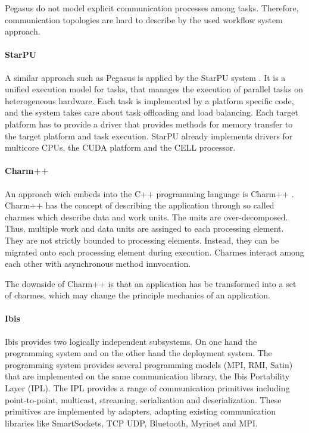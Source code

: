 Pegasus do not model explicit communication processes among tasks.
Therefore, communication topologies are hard to describe by the used
workflow system approach.


\paragraph*{StarPU} 
A similar approach such as Pegasus is applied by the StarPU system
\cite{ref:starpu}.  It is a unified execution model for tasks, that
manages the execution of parallel tasks on heterogeneous hardware.
Each task is implemented by a platform specific code, and the system
takes care about task offloading and load balancing. Each target
platform has to provide a driver that provides methods for memory
transfer to the target platform and task execution. StarPU already
implements drivers for multicore CPUs, the CUDA platform and the CELL
processor.

\paragraph*{Charm++} 
An approach wich embeds into the C++ programming language is
Charm++ \cite{ref:charm}. Charm++ has the concept of describing the
application through so called charmes which describe data and work
units. The units are over-decomposed. Thus, multiple work and data
units are assinged to each processing element. They are not strictly
bounded to processing elements. Instead, they can be migrated onto
each processing element during execution. Charmes interact among each
other with asynchronous method innvocation.

The downside of Charm++ is that an application has be transformed into
a set of charmes, which may change the principle mechanics of an
application.

\paragraph*{Ibis} 
Ibis \cite{ref:ibis} provides two logically independent subsystems.
On one hand the programming system and on the other hand the
deployment system. The programming system provides several programming
models (MPI, RMI, Satin) that are implemented on the same
communication library, the Ibis Portability Layer (IPL).  The IPL
provides a range of communication primitives including point-to-point,
multicast, streaming, serialization and deserialization. These
primitives are implemented by adapters, adapting existing
communication libraries like SmartSockets, TCP UDP, Bluetooth, Myrinet and
MPI.

